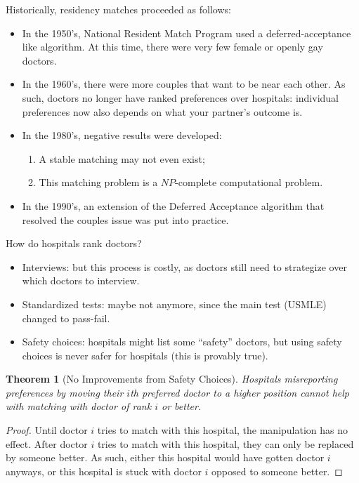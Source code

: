\documentclass[dvipsnames]{article}
\newtheorem{theorem}{Theorem}[section]
\theoremstyle{definition}
\theoremstyle{remark}
\begin{document}
Historically, residency matches proceeded as follows:
\begin{itemize}
	\item In the 1950's, National Resident Match Program used a deferred-acceptance like algorithm. At this time, there were very few female or openly gay doctors.
	\item In the 1960's, there were more couples that want to be near each other. As such, doctors no longer have ranked preferences over hospitals: individual preferences now also depends on what your partner's outcome is.
	\item In the 1980's, negative results were developed: 
	\begin{enumerate}
		\item A stable matching may not even exist;
		\item This matching problem is a $NP$-complete computational problem.
	\end{enumerate}
	\item In the 1990's, an extension of the Deferred Acceptance algorithm that resolved the couples issue was put into practice. 
\end{itemize}

How do hospitals rank doctors?
\begin{itemize}
	\item Interviews: but this process is costly, as doctors still need to strategize over which doctors to interview.
	\item Standardized tests: maybe not anymore, since the main test (USMLE) changed to pass-fail.
	\item Safety choices: hospitals might list some ``safety'' doctors, but using safety choices is never safer for hospitals (this is provably true).
\end{itemize}

\begin{theorem}[No Improvements from Safety Choices]
	Hospitals misreporting preferences by moving their $i$th preferred doctor to a higher position cannot help with matching with doctor of rank $i$ or better.
\end{theorem}

\begin{proof}
	Until doctor $i$ tries to match with this hospital, the manipulation has no effect. After doctor $i$ tries to match with this hospital, they can only be replaced by someone better. As such, either this hospital would have gotten doctor $i$ anyways, or this hospital is stuck with doctor $i$ opposed to someone better.
\end{proof}
\end{document}
